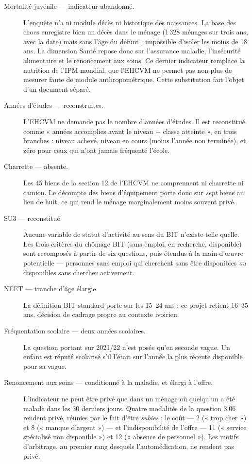 \documentclass[11pt,a4paper]{article}
\begin{document}
\begin{description}
  \item[Mortalité juvénile --- indicateur abandonné.] L'enquête n'a ni module décès ni historique
  des naissances. La base des chocs enregistre bien un décès dans le ménage (1\,328 ménages sur
  trois ans, avec la date) mais sans l'âge du défunt : impossible d'isoler les moins de 18 ans. La
  dimension Santé repose donc sur l'assurance maladie, l'insécurité alimentaire et le renoncement
  aux soins. Ce dernier indicateur remplace la nutrition de l'IPM mondial, que l'EHCVM ne permet
  pas non plus de mesurer faute de module anthropométrique. Cette substitution fait l'objet d'un
  document séparé.

  \item[Années d'études --- reconstruites.] L'EHCVM ne demande pas le nombre d'années d'études.
  Il est reconstitué comme « années accomplies avant le niveau + classe atteinte », en trois
  branches : niveau achevé, niveau en cours (moins l'année non terminée), et zéro pour ceux qui
  n'ont jamais fréquenté l'école.

  \item[Charrette --- absente.] Les 45 biens de la section 12 de l'EHCVM ne comprennent ni
  charrette ni camion. Le décompte des biens d'équipement porte donc sur \emph{sept} biens au lieu
  de huit, ce qui rend le ménage marginalement moins souvent privé.

  \item[SU3 --- reconstitué.] Aucune variable de statut d'activité au sens du BIT n'existe telle
  quelle. Les trois critères du chômage BIT (sans emploi, en recherche, disponible) sont
  recomposés à partir de six questions, puis étendus à la main-d'œuvre potentielle --- personnes
  sans emploi qui cherchent sans être disponibles \emph{ou} disponibles sans chercher activement.

  \item[NEET --- tranche d'âge élargie.] La définition BIT standard porte sur les 15--24 ans ; ce
  projet retient 16--35 ans, décision de cadrage propre au contexte ivoirien.

  \item[Fréquentation scolaire --- deux années scolaires.] La question portant sur 2021/22 n'est
  posée qu'en seconde vague. Un enfant est réputé scolarisé s'il l'était sur l'année la plus
  récente disponible pour sa vague.

  \item[Renoncement aux soins --- conditionné à la maladie, et élargi à l'offre.] L'indicateur ne
  peut être privé que dans un ménage où quelqu'un a été malade dans les 30 derniers jours. Quatre
  modalités de la question 3.06 rendent privé, réunies par le fait d'être \emph{subies} : le
  coût --- 2 (« trop cher ») et 8 (« manque d'argent ») --- et l'indisponibilité de l'offre --- 11
  (« service spécialisé non disponible ») et 12 (« absence de personnel »). Les motifs
  d'arbitrage, au premier rang desquels l'automédication, ne rendent pas privé.


\end{description}
\end{document}
